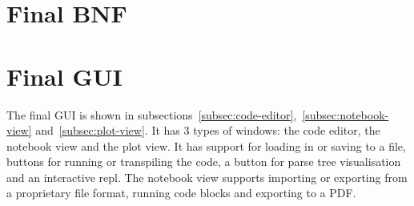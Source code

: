 \section{Final BNF}\label{sec:final-bnf}



\section{Final GUI}\label{sec:final-gui}

The final GUI is shown in subsections~\ref{subsec:code-editor},~\ref{subsec:notebook-view} and~\ref{subsec:plot-view}.
It has 3 types of windows: the code editor, the notebook view and the plot view.
It has support for loading in or saving to a file, buttons for running or transpiling the code, a button for parse 
tree visualisation and an interactive repl.
The notebook view supports importing or exporting from a proprietary file format, running code blocks and exporting 
to a PDF\@.

